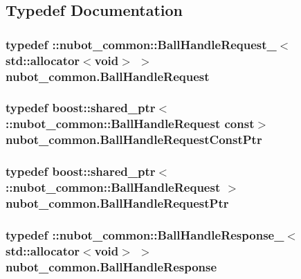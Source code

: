 \subsection{Typedef Documentation}
\hypertarget{namespacenubot__common_a100386a9c64318b13fb31e4548774326}{
\subsubsection[{Ball\-Handle\-Request}]{\setlength{\rightskip}{0pt plus 5cm}typedef \-::{\bf nubot\-\_\-common\-::\-Ball\-Handle\-Request\-\_\-}$<$std\-::allocator$<$void$>$ $>$ {\bf nubot\-\_\-common.\-Ball\-Handle\-Request}}}\label{namespacenubot__common_a100386a9c64318b13fb31e4548774326}
\hypertarget{namespacenubot__common_aef0f25206844e216fbe0463d8e65462a}{
\subsubsection[{Ball\-Handle\-Request\-Const\-Ptr}]{\setlength{\rightskip}{0pt plus 5cm}typedef boost\-::shared\-\_\-ptr$<$ \-::{\bf nubot\-\_\-common\-::\-Ball\-Handle\-Request} const$>$ {\bf nubot\-\_\-common.\-Ball\-Handle\-Request\-Const\-Ptr}}}\label{namespacenubot__common_aef0f25206844e216fbe0463d8e65462a}
\hypertarget{namespacenubot__common_aed1d54f270f295a530870904737db641}{
\subsubsection[{Ball\-Handle\-Request\-Ptr}]{\setlength{\rightskip}{0pt plus 5cm}typedef boost\-::shared\-\_\-ptr$<$ \-::{\bf nubot\-\_\-common\-::\-Ball\-Handle\-Request} $>$ {\bf nubot\-\_\-common.\-Ball\-Handle\-Request\-Ptr}}}\label{namespacenubot__common_aed1d54f270f295a530870904737db641}
\hypertarget{namespacenubot__common_a8444206679493f649058adca72f0e538}{
\subsubsection[{Ball\-Handle\-Response}]{\setlength{\rightskip}{0pt plus 5cm}typedef \-::{\bf nubot\-\_\-common\-::\-Ball\-Handle\-Response\-\_\-}$<$std\-::allocator$<$void$>$ $>$ {\bf nubot\-\_\-common.\-Ball\-Handle\-Response}}}\label{namespacenubot__common_a8444206679493f649058adca72f0e538}
